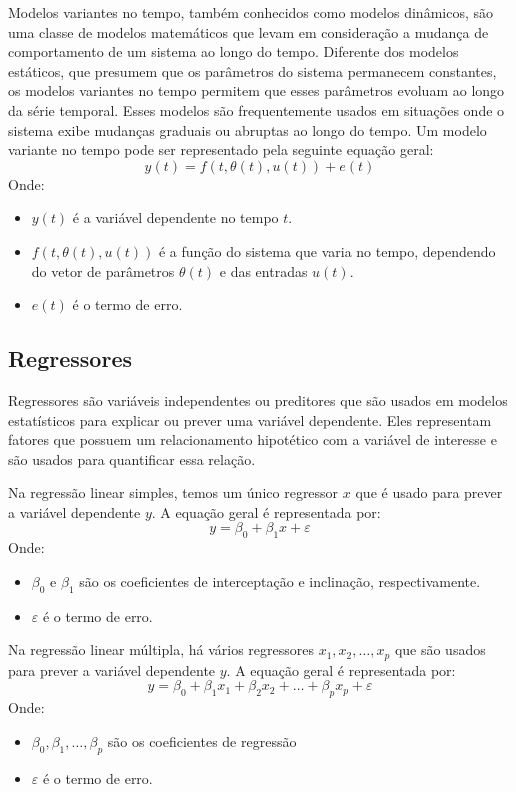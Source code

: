 \documentclass[a4paper,12pt]{article}
\begin{document}
Modelos variantes no tempo, também conhecidos como modelos dinâmicos, são uma classe de modelos matemáticos que levam em consideração a mudança de comportamento de um sistema ao longo do tempo. Diferente dos modelos estáticos, que presumem que os parâmetros do sistema permanecem constantes, os modelos variantes no tempo permitem que esses parâmetros evoluam ao longo da série temporal. Esses modelos são frequentemente usados em situações onde o sistema exibe mudanças graduais ou abruptas ao longo do tempo. Um modelo variante no tempo pode ser representado pela seguinte equação geral:
\begin{equation}
    y(t) = f(t, \theta(t), u(t)) + e(t)\tag{2.13.1}
\end{equation}
Onde:
\begin{itemize}
    \item \(y(t)\) é a variável dependente no tempo \(t\).
    \item \(f(t, \theta(t), u(t))\) é a função do sistema que varia no tempo, dependendo do vetor de parâmetros \(\theta(t)\) e das entradas \(u(t)\).
    \item \(e(t)\) é o termo de erro.
\end{itemize}

\subsection{Regressores}

Regressores são variáveis independentes ou preditores que são usados em modelos estatísticos para explicar ou prever uma variável dependente. Eles representam fatores que possuem um relacionamento hipotético com a variável de interesse e são usados para quantificar essa relação.

Na regressão linear simples, temos um único regressor \(x\) que é usado para prever a variável dependente \(y\). A equação geral é representada por:
\begin{equation}
    y = \beta_0 + \beta_1 x + \varepsilon\tag{2.14.1}
\end{equation}
Onde:
\begin{itemize}
    \item \(\beta_0\) e \(\beta_1\) são os coeficientes de interceptação e inclinação, respectivamente.
    \item \(\varepsilon\) é o termo de erro.
\end{itemize}
Na regressão linear múltipla, há vários regressores \(x_1, x_2, \ldots, x_p\) que são usados para prever a variável dependente \(y\). A equação geral é representada por:
\begin{equation}
    y = \beta_0 + \beta_1 x_1 + \beta_2 x_2 + \ldots + \beta_p x_p + \varepsilon\tag{2.14.2}
\end{equation}
Onde:
\begin{itemize}
    \item \(\beta_0, \beta_1, \ldots, \beta_p\) são os coeficientes de regressão 
    \item \(\varepsilon\) é o termo de erro.
\end{itemize}
\end{document}
